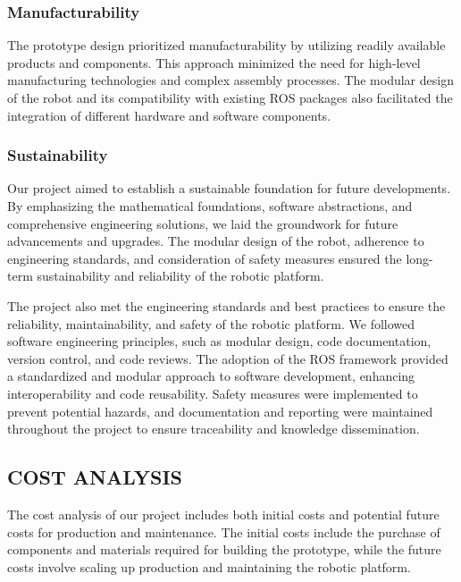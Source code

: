 \documentclass[12pt]{article}
\begin{document}
        \subsubsection{Manufacturability}

        The prototype design prioritized manufacturability by utilizing readily available products and components. This approach minimized the need for high-level manufacturing technologies and complex assembly processes. The modular design of the robot and its compatibility with existing ROS packages also facilitated the integration of different hardware and software components.

        \subsubsection{Sustainability}

        Our project aimed to establish a sustainable foundation for future developments. By emphasizing the mathematical foundations, software abstractions, and comprehensive engineering solutions, we laid the groundwork for future advancements and upgrades. The modular design of the robot, adherence to engineering standards, and consideration of safety measures ensured the long-term sustainability and reliability of the robotic platform.

        The project also met the engineering standards and best practices to ensure the reliability, maintainability, and safety of the robotic platform. We followed software engineering principles, such as modular design, code documentation, version control, and code reviews. The adoption of the ROS framework provided a standardized and modular approach to software development, enhancing interoperability and code reusability. Safety measures were implemented to prevent potential hazards, and documentation and reporting were maintained throughout the project to ensure traceability and knowledge dissemination.

    \subsection{COST ANALYSIS}

    The cost analysis of our project includes both initial costs and potential future costs for production and maintenance. The initial costs include the purchase of components and materials required for building the prototype, while the future costs involve scaling up production and maintaining the robotic platform.
\end{document}
